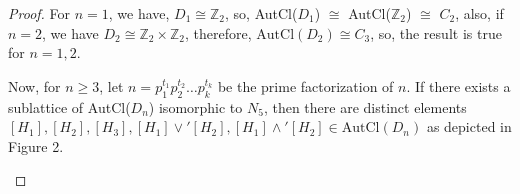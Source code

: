 \documentclass{article}
\theoremstyle{definition}
\begin{document}
\begin{proof}
     For $n=1$, we have, $D_1\cong \mathbb{Z}_2$, so, AutCl($D_1$) $ \cong$ AutCl($\mathbb{Z}_2$) $\cong$ $C_2$, also, if $n=2$, we have $D_2\cong \mathbb{Z}_2 \times \mathbb{Z}_2$, therefore, $\text{AutCl}(D_2)\cong C_3$, so, the result is true for $n=1,2$. \par Now, for $n\ge 3$, let $n=p_1^{t_1}p_2^{t_2}\dots p_k^{t_k}$ be the prime factorization of $n$. If there exists a sublattice of AutCl($D_n$) isomorphic to $N_5$, then there are distinct elements $[H_1],[H_2],[H_3],[H_1]\vee'[H_2],[H_1]\wedge' [H_2] \in \text{AutCl}(D_n)$ as depicted in Figure 2. 
\begin{figure}[h!]
    \centering
\end{figure}
\end{proof}
\end{document}
